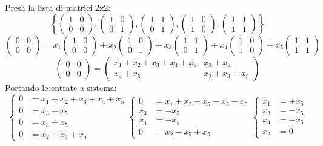 \documentclass[a4paper,12pt]{article}
\begin{document}
	Presa la lista di matrici 2x2:
	\[\left\{\begin{pmatrix} 1 & 0 \\ 0 & 0 \end{pmatrix}, \begin{pmatrix} 1 & 0 \\ 0 & 1 \end{pmatrix}, \begin{pmatrix} 1 & 1 \\ 0 & 1 \end{pmatrix}, \begin{pmatrix} 1 & 0 \\ 1 & 0 \end{pmatrix}, \begin{pmatrix} 1 & 1 \\ 1 & 1 \end{pmatrix}\right\}\]
	\[\begin{pmatrix} 0 & 0 \\ 0 & 0 \end{pmatrix} = x_1\begin{pmatrix} 1 & 0 \\ 0 & 0 \end{pmatrix} + x_2 \begin{pmatrix} 1 & 0 \\ 0 & 1 \end{pmatrix} + x_3 \begin{pmatrix} 1 & 1 \\ 0 & 1 \end{pmatrix} + x_4\begin{pmatrix} 1 & 0 \\ 1 & 0 \end{pmatrix} + x_5 \begin{pmatrix} 1 & 1 \\ 1 & 1 \end{pmatrix}\]
	\[\begin{pmatrix} 0 & 0 \\ 0 & 0 \end{pmatrix} = \begin{pmatrix} x_1 + x_2 + x_3 + x_4 + x_5 & x_3 + x_5 \\ x_4 + x_5 & x_2 + x_3 + x_5\end{pmatrix}\]
	Portando le entrate a sistema:
	\[\left\{\begin{aligned}
		0 & = x_1 + x_2 + x_3 + x_4 + x_5 \\
		0 & = x_3 + x_5\\
		0 & = x_4 + x_5\\
		0 & = x_2 + x_3 + x_5
	\end{aligned}\right.
	\left\{\begin{aligned}
		0 & = x_1 + x_2 -x_5 -x_5 + x_5 \\
		x_3 & = -x_5\\
		x_4 & = -x_5\\
		0 & = x_2 -x_5 + x_5
	\end{aligned}\right.
	\left\{\begin{aligned}
	x_1 & = +x_5 \\
	x_3 & = -x_5\\
	x_4 & = -x_5\\
	x_2 & = 0
	\end{aligned}\right.\]
\end{document}
